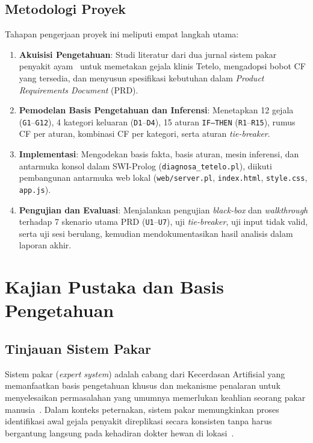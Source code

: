 \documentclass[12pt,a4paper]{report}
\begin{document}
\section{Metodologi Proyek}
Tahapan pengerjaan proyek ini meliputi empat langkah utama:
\begin{enumerate}
  \item \textbf{Akuisisi Pengetahuan}: Studi literatur dari dua jurnal sistem pakar penyakit ayam~\cite{azzahra2026,ahsyar2021} untuk memetakan gejala klinis Tetelo, mengadopsi bobot CF yang tersedia, dan menyusun spesifikasi kebutuhan dalam \textit{Product Requirements Document} (PRD).
  \item \textbf{Pemodelan Basis Pengetahuan dan Inferensi}: Menetapkan 12 gejala (\texttt{G1}--\texttt{G12}), 4 kategori keluaran (\texttt{D1}--\texttt{D4}), 15 aturan \texttt{IF--THEN} (\texttt{R1}--\texttt{R15}), rumus CF per aturan, kombinasi CF per kategori, serta aturan \textit{tie-breaker}.
  \item \textbf{Implementasi}: Mengodekan basis fakta, basis aturan, mesin inferensi, dan antarmuka konsol dalam SWI-Prolog (\texttt{diagnosa\_tetelo.pl}), diikuti pembangunan antarmuka web lokal (\texttt{web/server.pl}, \texttt{index.html}, \texttt{style.css}, \texttt{app.js}).
  \item \textbf{Pengujian dan Evaluasi}: Menjalankan pengujian \textit{black-box} dan \textit{walkthrough} terhadap 7 skenario utama PRD (\texttt{U1}--\texttt{U7}), uji \textit{tie-breaker}, uji input tidak valid, serta uji sesi berulang, kemudian mendokumentasikan hasil analisis dalam laporan akhir.
\end{enumerate}

\chapter{Kajian Pustaka dan Basis Pengetahuan}

\section{Tinjauan Sistem Pakar}
Sistem pakar (\textit{expert system}) adalah cabang dari Kecerdasan Artifisial yang memanfaatkan basis pengetahuan khusus dan mekanisme penalaran untuk menyelesaikan permasalahan yang umumnya memerlukan keahlian seorang pakar manusia~\cite{ahsyar2021}. Dalam konteks peternakan, sistem pakar memungkinkan proses identifikasi awal gejala penyakit direplikasi secara konsisten tanpa harus bergantung langsung pada kehadiran dokter hewan di lokasi~\cite{azzahra2026}.
\end{document}
